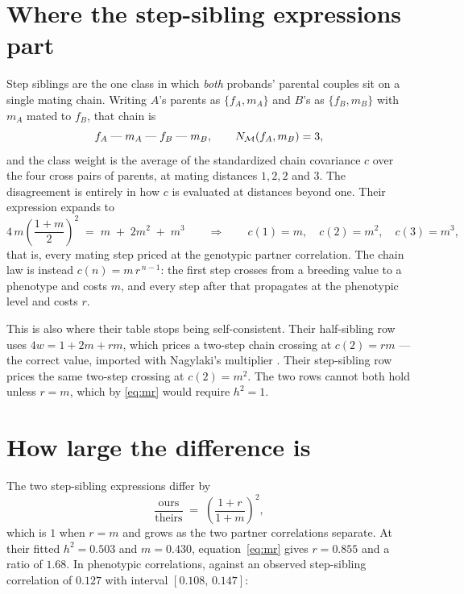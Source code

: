 \documentclass[12pt]{article}
\begin{document}
\section{Where the step-sibling expressions part}

Step siblings are the one class in which \emph{both} probands' parental couples sit on a single mating chain.
Writing $A$'s parents as $\{f_A, m_A\}$ and $B$'s as $\{f_B, m_B\}$ with $m_A$ mated to $f_B$, that chain is
\begin{equation*}
    f_A \;\text{---}\; m_A \;\text{---}\; f_B \;\text{---}\; m_B ,
    \qquad N_{\mathcal{M}}(f_A, m_B) = 3 ,
\end{equation*}
and the class weight is the average of the standardized chain covariance $c$ over the four cross pairs of parents, at mating distances $1, 2, 2$ and $3$.
The disagreement is entirely in how $c$ is evaluated at distances beyond one.
Their expression expands to
\begin{equation*}
    4\,m\left(\frac{1+m}{2}\right)^{2}
    \;=\; m \;+\; 2m^{2} \;+\; m^{3}
    \qquad\Longrightarrow\qquad
    c(1) = m,\quad c(2) = m^{2},\quad c(3) = m^{3},
\end{equation*}
that is, every mating step priced at the genotypic partner correlation.
The chain law is instead $c(n) = m\,r^{\,n-1}$: the first step crosses from a breeding value to a phenotype and costs $m$, and every step after that propagates at the phenotypic level and costs $r$.

This is also where their table stops being self-consistent.
Their half-sibling row uses $4w = 1 + 2m + rm$, which prices a two-step chain crossing at $c(2) = rm$ --- the correct value, imported with Nagylaki's multiplier \citep{Nagylaki1978}.
Their step-sibling row prices the same two-step crossing at $c(2) = m^{2}$.
The two rows cannot both hold unless $r = m$, which by \eqref{eq:mr} would require $h^2 = 1$.

\section{How large the difference is}

The two step-sibling expressions differ by
\begin{equation}\label{eq:gap}
    \frac{\text{ours}}{\text{theirs}} \;=\; \left(\frac{1+r}{1+m}\right)^{\!2} ,
\end{equation}
which is $1$ when $r = m$ and grows as the two partner correlations separate.
At their fitted $h^2 = 0.503$ and $m = 0.430$, equation~\eqref{eq:mr} gives $r = 0.855$ and a ratio of $1.68$.
In phenotypic correlations, against an observed step-sibling correlation of $0.127$ with interval $[0.108,\, 0.147]$:
\end{document}
